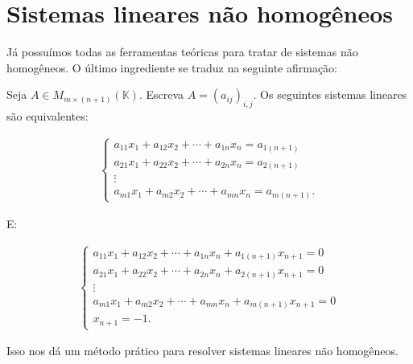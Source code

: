 \section{Sistemas lineares não homogêneos}

Já possuímos todas as ferramentas teóricas para tratar de sistemas não homogêneos.
O último ingrediente se traduz na seguinte afirmação:

\begin{lemma}
Seja $A\in M_{m\times (n+1)}(\mathbb K)$.
Escreva $A=(a_{ij})_{i, j}$.
Os seguintes sistemas lineares são equivalentes:

\begin{align*}
        \begin{cases}
            a_{11}x_1 + a_{12}x_2 + \cdots + a_{1n}x_n = a_{1(n+1)} \\
            a_{21}x_1 + a_{22}x_2 + \cdots + a_{2n}x_n = a_{2(n+1)} \\
            \vdots \\
            a_{m1}x_1 + a_{m2}x_2 + \cdots + a_{mn}x_n = a_{m(n+1)}.
        \end{cases}
\end{align*}

E:

\begin{align*}
        \begin{cases}
            a_{11}x_1 + a_{12}x_2 + \cdots + a_{1n}x_n +a_{1(n+1)}x_{n+1}=0 \\
            a_{21}x_1 + a_{22}x_2 + \cdots + a_{2n}x_n +a_{2(n+1)}x_{n+1}=0 \\
            \vdots \\
            a_{m1}x_1 + a_{m2}x_2 + \cdots + a_{mn}x_n +a_{m(n+1)}x_{n+1}=0 \\
            x_{n+1}=-1.
        \end{cases}
\end{align*}
\end{lemma}

Isso nos dá um método prático para resolver sistemas lineares não homogêneos.

